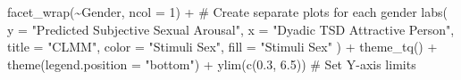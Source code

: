 \documentclass[
  bookmarksnumbered]{article}
\newenvironment{Shaded}{\begin{snugshade}}{\end{snugshade}}
\newcommand{\AttributeTok}[1]{\textcolor[rgb]{0.80,0.80,0.80}{#1}}
\newcommand{\CommentTok}[1]{\textcolor[rgb]{0.50,0.62,0.50}{#1}}
\newcommand{\DecValTok}[1]{\textcolor[rgb]{0.86,0.86,0.80}{#1}}
\newcommand{\FloatTok}[1]{\textcolor[rgb]{0.75,0.75,0.82}{#1}}
\newcommand{\FunctionTok}[1]{\textcolor[rgb]{0.94,0.94,0.56}{#1}}
\newcommand{\NormalTok}[1]{\textcolor[rgb]{0.80,0.80,0.80}{#1}}
\newcommand{\SpecialCharTok}[1]{\textcolor[rgb]{0.86,0.64,0.64}{#1}}
\newcommand{\StringTok}[1]{\textcolor[rgb]{0.80,0.58,0.58}{#1}}
\begin{document}
\begin{Shaded}
\begin{Highlighting}[]
  \FunctionTok{facet\_wrap}\NormalTok{(}\SpecialCharTok{\textasciitilde{}}\NormalTok{Gender, }\AttributeTok{ncol =} \DecValTok{1}\NormalTok{) }\SpecialCharTok{+} \CommentTok{\# Create separate plots for each gender}
  \FunctionTok{labs}\NormalTok{(}
    \AttributeTok{y =} \StringTok{"Predicted Subjective Sexual Arousal"}\NormalTok{,}
    \AttributeTok{x =} \StringTok{"Dyadic TSD Attractive Person"}\NormalTok{,}
    \AttributeTok{title =} \StringTok{"CLMM"}\NormalTok{, }\AttributeTok{color =} \StringTok{"Stimuli Sex"}\NormalTok{, }\AttributeTok{fill =} \StringTok{"Stimuli Sex"}
\NormalTok{  ) }\SpecialCharTok{+}
  \FunctionTok{theme\_tq}\NormalTok{() }\SpecialCharTok{+}
  \FunctionTok{theme}\NormalTok{(}\AttributeTok{legend.position =} \StringTok{"bottom"}\NormalTok{) }\SpecialCharTok{+}
  \FunctionTok{ylim}\NormalTok{(}\FunctionTok{c}\NormalTok{(}\FloatTok{0.3}\NormalTok{, }\FloatTok{6.5}\NormalTok{)) }\CommentTok{\# Set Y{-}axis limits}


\end{Highlighting}
\end{Shaded}
\end{document}
